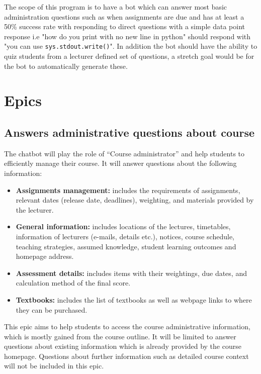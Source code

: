 \documentclass{article}
\begin{document}
The scope of this program is to have a bot which can answer most basic administration questions such as when assignments are due and has at least a 50\% success rate with responding to direct questions with a simple data point response i.e "how do you print with no new line in python" should respond with "you can use \texttt{sys.stdout.write()}". In addition the bot should have the ability to quiz students from a lecturer defined set of questions, a stretch goal would be for the bot to automatically generate these.


\section{Epics}

\subsection{Answers administrative questions about course}

The chatbot will play the role of “Course administrator” and help students to efficiently manage their course. It will answer questions about the following information:
\begin{itemize}
  \item \textbf{Assignments management:} includes the requirements of assignments, relevant dates (release date, deadlines), weighting, and materials provided by the lecturer.
  \item \textbf{General information:} includes locations of the lectures, timetables, information of lecturers (e-mails, details etc.), notices, course schedule, teaching strategies, assumed knowledge, student learning outcomes and homepage address.
  \item \textbf{Assessment details:} includes items with their weightings, due dates, and calculation method of the final score.
  \item \textbf{Textbooks:} includes the list of textbooks as well as webpage links to where they can be purchased.
\end{itemize}

This epic aims to help students to access the course administrative information, which is mostly gained from the course outline. It will be limited to answer questions about existing information which is already provided by the course homepage. Questions about further information such as detailed course context will not be included in this epic.
\end{document}
